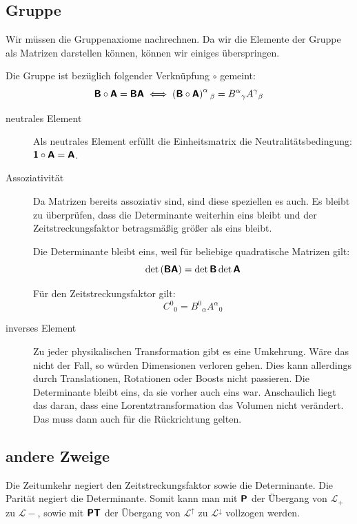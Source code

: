 \subsection{Gruppe}

Wir müssen die Gruppenaxiome nachrechnen. Da wir die Elemente der Gruppe als
Matrizen darstellen können, können wir einiges überspringen.

Die Gruppe ist bezüglich folgender Verknüpfung $\circ$ gemeint:
\[
	\tens B \circ \tens A = \tens B \tens A
	\iff
	\del{\tens B \circ \tens A}^\alpha{}_\beta
	= B^\alpha{}_\gamma A^\gamma{}_\beta
\]

\begin{description}
	\item[neutrales Element]
		Als neutrales Element erfüllt die Einheitsmatrix die
		Neutralitätsbedingung: $\boldsymbol{\mathsf{1}} \circ \boldsymbol{\mathsf{A}} = \boldsymbol{\mathsf{A}}$.

	\item[Assoziativität]
		Da Matrizen bereits assoziativ sind, sind diese speziellen es auch. Es
		bleibt zu überprüfen, dass die Determinante weiterhin eins bleibt und
		der Zeitstreckungsfaktor betragsmäßig größer als eins bleibt.

		Die Determinante bleibt eins, weil für beliebige quadratische Matrizen
		gilt:
		\[
			\det\del{\tens B \tens A} = \det \tens B \det \tens A
		\]

		Für den Zeitstreckungsfaktor gilt:
		\[
			C^0{}_0 = B^0{}_\alpha A^\alpha{}_0
		\]

		\fehlt

	\item[inverses Element]
		Zu jeder physikalischen Transformation gibt es eine Umkehrung. Wäre das
		nicht der Fall, so würden Dimensionen verloren gehen. Dies kann
		allerdings durch Translationen, Rotationen oder Boosts nicht passieren.
		Die Determinante bleibt eins, da sie vorher auch eins war. Anschaulich
		liegt das daran, dass eine Lorentztransformation das Volumen nicht
		verändert.  Das muss dann auch für die Rückrichtung gelten.
\end{description}

\subsection{andere Zweige}

Die Zeitumkehr negiert den Zeitstreckungsfaktor sowie die Determinante. Die
Parität negiert die Determinante. Somit kann man mit $\boldsymbol{\mathsf{P}}$ der Übergang von
$\mathcal L_+$ zu $\mathcal L-$, sowie mit $\boldsymbol{\mathsf{P}} \boldsymbol{\mathsf{T}}$ der Übergang von
$\mathcal L^\uparrow$ zu $\mathcal L^\downarrow$ vollzogen werden.

